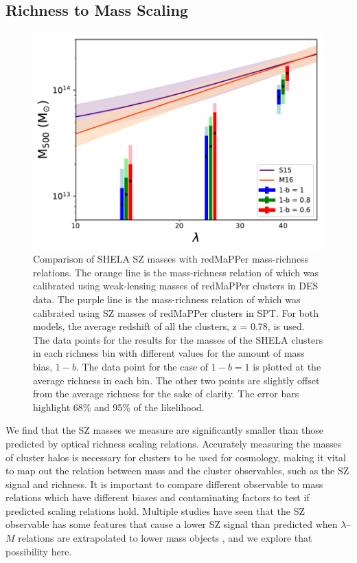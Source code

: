 \documentclass[a4paper,fleqn,usenatbib]{mnras}
\begin{document}
\subsection{Richness to Mass Scaling}
\begin{figure}
  \centering
    \includegraphics[width=\columnwidth] {M500_lambda_shela_sptvsrm_radiocorr.pdf}
  \caption{Comparison of SHELA SZ masses with redMaPPer mass-richness relations. The orange line is the mass-richness relation of \protect \cite{2016arXiv161006890M} which was calibrated using weak-lensing masses of redMaPPer clusters in DES data. The purple line is the mass-richness relation of \protect \cite{2015MNRAS.454.2305S} which was calibrated using SZ masses of redMaPPer clusters in SPT. For both models, the average redshift of all the clusters, z = 0.78, is used. The data points for the results for the masses of the SHELA clusters in each richness bin with different values for the amount of mass bias, $1-b$. The data point for the case of $1-b=1$ is plotted at the average richness in each bin. The other two points are slightly offset from the average richness for the sake of clarity. The error bars highlight 68\% and 95\% of the likelihood.}
  \label{fig:y500vslambda}
\end{figure}


We find that the SZ masses we measure are significantly smaller than those predicted by optical richness scaling relations. 
Accurately measuring the masses of cluster halos is necessary for clusters to be used for cosmology, making it vital to map out the relation between mass and the cluster observables, such as the SZ signal and richness. 
It is important to compare different observable to mass relations which have different biases and contaminating factors to test if predicted scaling relations hold. 
Multiple studies have seen that the SZ observable has some features that cause a lower SZ signal than predicted when $\lambda$--$M$ relations are extrapolated to lower mass objects \citep{2011A&A...536A..12P,2012PhRvD..85b3005D,2013ApJ...767...38S, 2017MNRAS.468.3347S}, and we explore that possibility here.  
\end{document}
